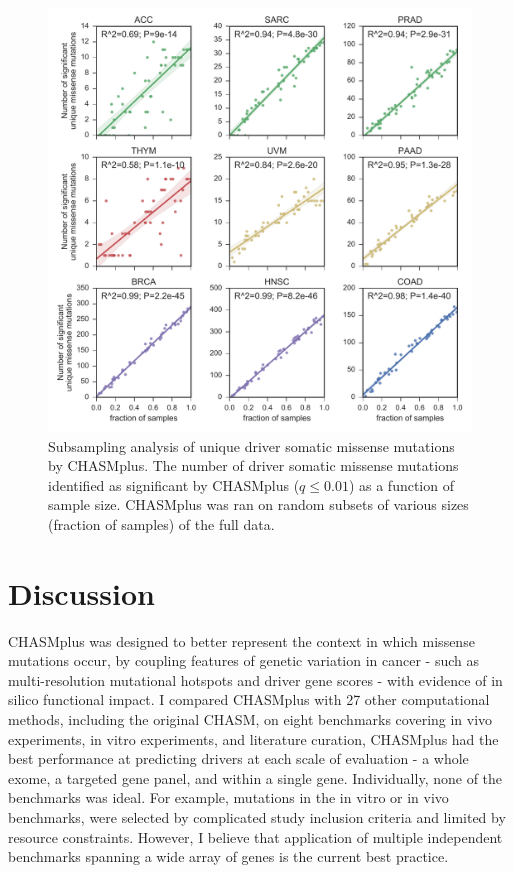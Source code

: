 \begin{figure}
  \centering
  \makeatletter
  \let\@currsize\normalsize
  \includegraphics[width=0.9\linewidth]{figures/chapter6/sub_sampling_num_unique.pdf}
  \caption[Subsampling analysis of unique driver somatic missense mutations by CHASMplus.]{Subsampling analysis of unique driver somatic missense mutations by CHASMplus. The number of driver somatic missense mutations identified as significant by CHASMplus ($q \leq 0.01$) as a function of sample size. CHASMplus was ran on random subsets of various sizes (fraction of samples) of the full data.}
  \label{fig:chasmplus_subsampling}
\end{figure}

\section{Discussion}

CHASMplus was designed to better represent the context in which missense mutations occur, by coupling features of genetic variation in cancer - such as multi-resolution mutational hotspots and driver gene scores - with evidence of in silico functional impact.  I compared CHASMplus with 27 other computational methods, including the original CHASM, on eight benchmarks covering in vivo experiments, in vitro experiments, and literature curation, CHASMplus had the best performance at predicting drivers at each scale of evaluation - a whole exome, a targeted gene panel, and within a single gene.   Individually, none of the benchmarks was ideal.  For example, mutations in the in vitro or in vivo benchmarks, were selected by complicated study inclusion criteria and limited by resource constraints.  However, I believe that application of multiple independent benchmarks spanning a wide array of genes is the current best practice.

